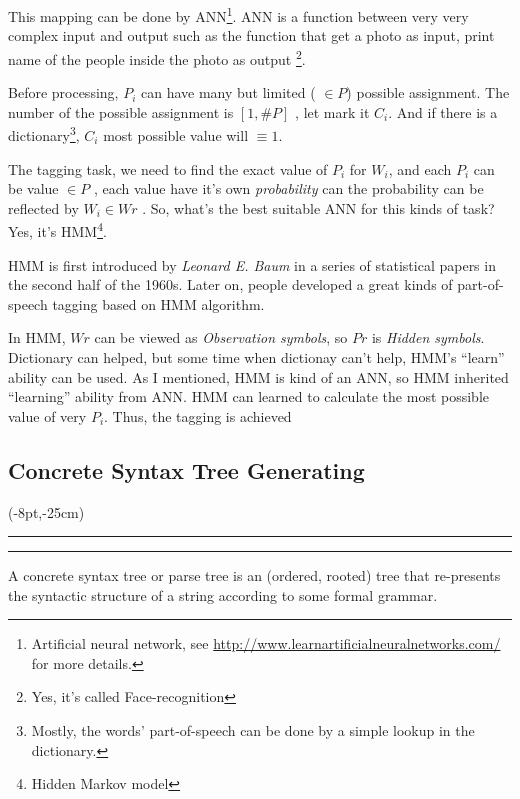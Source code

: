 This mapping can be done by ANN\footnote{Artificial neural network, see \url{http://www.learnartificialneuralnetworks.com/} for more details. }.
ANN is a function between very very complex input and output such as the function that get a photo as input, print name of the people inside the photo as output \footnote{Yes, it's called Face-recognition}.

Before processing, $P_i$ can have many but limited ( $\in P$) possible  assignment. The number of the possible assignment is $[1, \#P ] $ , let mark it $ C_i $. 
And if there is a dictionary\footnote{Mostly, the words' part-of-speech can be done by a simple lookup in the dictionary.}, $ C_i $ most possible value will $ \equiv 1 $. 

The tagging task, we need to find the exact value of $P_i$ for $W_i$, and each $P_i$ can be value $ \in P $ ,  each value have it's own \emph{probability} can the probability can be reflected by $ W_i \in Wr $ . So, what's the best suitable ANN for this kinds of task? Yes, it's HMM\footnote{Hidden Markov model}{\citep{HMM_Based_Part_Of_Speech_Tagging}}.

HMM is first introduced by \emph{Leonard E. Baum} in a series of statistical papers in the second half of the 1960s. Later on, people developed a great kinds of part-of-speech tagging based on HMM algorithm. 

In HMM, $ Wr $ can be viewed as \emph{Observation symbols}, so $Pr$ is \emph{Hidden symbols}. Dictionary can helped, but some time when dictionay can't help, HMM's ``learn'' ability  can be used. As I mentioned, HMM is kind of an ANN, so HMM inherited ``learning'' ability from ANN.
HMM can learned to calculate the most possible value of very $P_i$. Thus, the tagging is achieved

\subsection{Concrete Syntax Tree Generating}

\thisfancyput(-8pt,-25cm){
\rule{.5pt}{25cm}
\hspace*{\textwidth}
\rule{.5pt}{25cm}
}


A concrete syntax tree\cite{cst} or parse tree is an (ordered, rooted) tree that re-presents the syntactic structure of a string according to some formal grammar.

